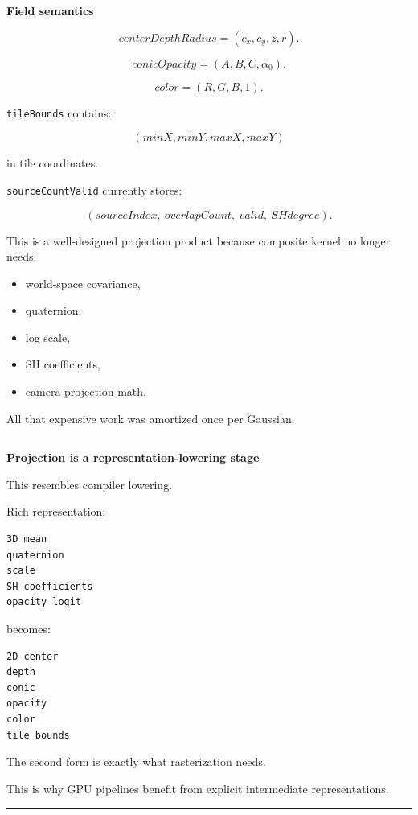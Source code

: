 \textbf{Field semantics}

\[
centerDepthRadius
=
(c_x,c_y,z,r).
\]

\[
conicOpacity
=
(A,B,C,\alpha_0).
\]

\[
color
=
(R,G,B,1).
\]

\texttt{tileBounds} contains:

\[
(minX,minY,maxX,maxY)
\]

in tile coordinates.

\texttt{sourceCountValid} currently stores:

\[
(sourceIndex,\ overlapCount,\ valid,\ SHdegree).
\]

This is a well-designed projection product because composite kernel no longer needs:

\begin{itemize}
\tightlist
\item
  world-space covariance,
\item
  quaternion,
\item
  log scale,
\item
  SH coefficients,
\item
  camera projection math.
\end{itemize}

All that expensive work was amortized once per Gaussian.

\begin{center}\rule{0.5\linewidth}{0.5pt}\end{center}

\textbf{Projection is a representation-lowering stage}

This resembles compiler lowering.

Rich representation:

\protect{}\label{jyhwui}%
\begin{verbatim}
3D mean
quaternion
scale
SH coefficients
opacity logit
\end{verbatim}

becomes:

\protect{}\label{z54oi2}%
\begin{verbatim}
2D center
depth
conic
opacity
color
tile bounds
\end{verbatim}

The second form is exactly what rasterization needs.

This is why GPU pipelines benefit from explicit intermediate representations.

\begin{center}\rule{0.5\linewidth}{0.5pt}\end{center}

